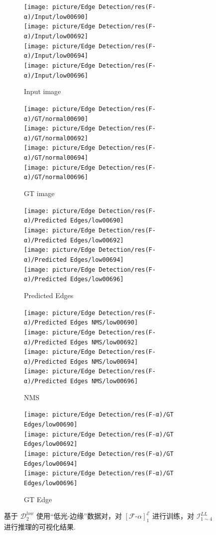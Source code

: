 \documentclass[a4paper]{ctexart}
\begin{document}
	\begin{figure}[htbp]
		\centering
		\begin{subfigure}{0.16\textwidth}
			\texttt{[image: picture/Edge Detection/res(F-α)/Input/low00690]} \\
			\texttt{[image: picture/Edge Detection/res(F-α)/Input/low00692]} \\
			\texttt{[image: picture/Edge Detection/res(F-α)/Input/low00694]} \\
			\texttt{[image: picture/Edge Detection/res(F-α)/Input/low00696]}
			\caption{Input image}
		\end{subfigure}
		\begin{subfigure}{0.16\textwidth}
			\texttt{[image: picture/Edge Detection/res(F-α)/GT/normal00690]} \\
			\texttt{[image: picture/Edge Detection/res(F-α)/GT/normal00692]} \\
			\texttt{[image: picture/Edge Detection/res(F-α)/GT/normal00694]} \\
			\texttt{[image: picture/Edge Detection/res(F-α)/GT/normal00696]}
			\caption{GT image}
		\end{subfigure}
		\begin{subfigure}{0.16\textwidth}
			\texttt{[image: picture/Edge Detection/res(F-α)/Predicted Edges/low00690]} \\
			\texttt{[image: picture/Edge Detection/res(F-α)/Predicted Edges/low00692]} \\
			\texttt{[image: picture/Edge Detection/res(F-α)/Predicted Edges/low00694]} \\
			\texttt{[image: picture/Edge Detection/res(F-α)/Predicted Edges/low00696]}
			\caption{Predicted Edges}
		\end{subfigure}
		\begin{subfigure}{0.16\textwidth}
			\texttt{[image: picture/Edge Detection/res(F-α)/Predicted Edges NMS/low00690]} \\
			\texttt{[image: picture/Edge Detection/res(F-α)/Predicted Edges NMS/low00692]} \\
			\texttt{[image: picture/Edge Detection/res(F-α)/Predicted Edges NMS/low00694]} \\
			\texttt{[image: picture/Edge Detection/res(F-α)/Predicted Edges NMS/low00696]}
			\caption{NMS}
		\end{subfigure}
		\begin{subfigure}{0.16\textwidth}
			\texttt{[image: picture/Edge Detection/res(F-α)/GT Edges/low00690]} \\
			\texttt{[image: picture/Edge Detection/res(F-α)/GT Edges/low00692]} \\
			\texttt{[image: picture/Edge Detection/res(F-α)/GT Edges/low00694]} \\
			\texttt{[image: picture/Edge Detection/res(F-α)/GT Edges/low00696]}
			\caption{GT Edge}
		\end{subfigure}
		\caption{基于 $\mathcal{D}^{low}_{2}$ 使用“低光-边缘”数据对，对 ${\left[\mathcal{F}\text{-}\alpha\right]}^{\mathcal{E}}_1$ 进行训练，对 $\mathcal{I}_{1 \sim 4}^{LL}$ 进行推理的可视化结果.}
	\end{figure}
	
\end{document}
